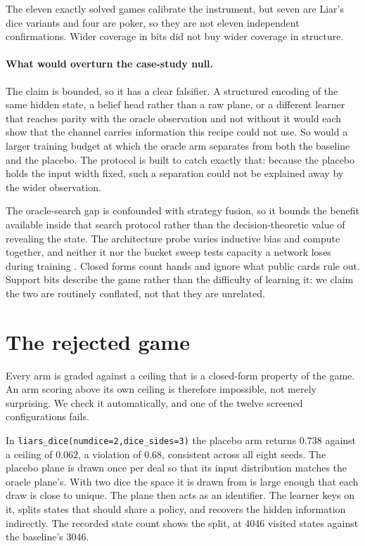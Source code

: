 \documentclass{article}
\begin{document}
The eleven exactly solved games calibrate the instrument, but seven are Liar's dice variants and four are poker, so they are not eleven independent confirmations. Wider coverage in bits did not buy wider coverage in structure.

\paragraph{What would overturn the case-study null.} The claim is bounded, so it has a clear falsifier. A structured encoding of the same hidden state, a belief head rather than a raw plane, or a different learner that reaches parity with the oracle observation and not without it would each show that the channel carries information this recipe could not use. So would a larger training budget at which the oracle arm separates from both the baseline and the placebo. The protocol is built to catch exactly that: because the placebo holds the input width fixed, such a separation could not be explained away by the wider observation.

The oracle-search gap is confounded with strategy fusion, so it bounds the benefit available inside that search protocol rather than the decision-theoretic value of revealing the state. The architecture probe varies inductive bias and compute together, and neither it nor the bucket sweep tests capacity a network loses during training \citep{capacityloss}. Closed forms count hands and ignore what public cards rule out. Support bits describe the game rather than the difficulty of learning it: we claim the two are routinely conflated, not that they are unrelated.

\section{The rejected game}
\label{app:reject}

Every arm is graded against a ceiling that is a closed-form property of the game. An arm scoring above its own ceiling is therefore impossible, not merely surprising. We check it automatically, and one of the twelve screened configurations fails.

In \texttt{liars\_dice(numdice=2,dice\_sides=3)} the placebo arm returns $0.738$ against a ceiling of $0.062$, a violation of $0.68$, consistent across all eight seeds. The placebo plane is drawn once per deal so that its input distribution matches the oracle plane's. With two dice the space it is drawn from is large enough that each draw is close to unique. The plane then acts as an identifier. The learner keys on it, splits states that should share a policy, and recovers the hidden information indirectly. The recorded state count shows the split, at 4046 visited states against the baseline's 3046.
\end{document}
